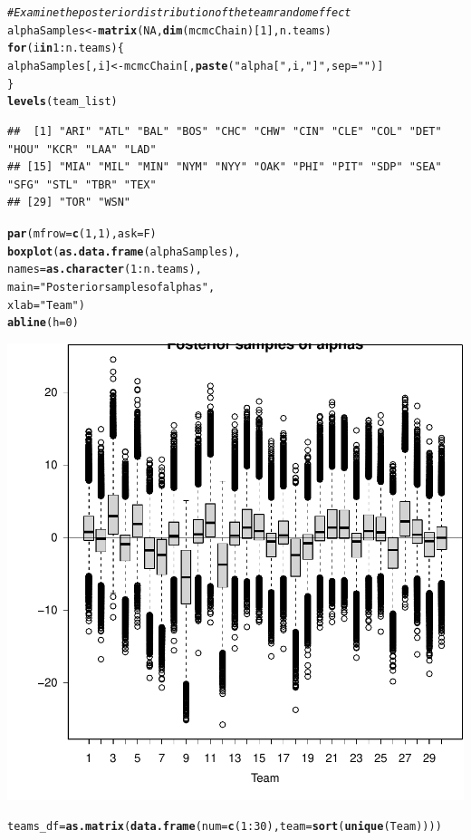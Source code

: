 \documentclass{article}\usepackage[]{graphicx}\usepackage[]{color}
\makeatletter
\newcommand{\hlnum}[1]{\textcolor[rgb]{0.686,0.059,0.569}{#1}}%
\newcommand{\hlstr}[1]{\textcolor[rgb]{0.192,0.494,0.8}{#1}}%
\newcommand{\hlcom}[1]{\textcolor[rgb]{0.678,0.584,0.686}{\textit{#1}}}%
\newcommand{\hlopt}[1]{\textcolor[rgb]{0,0,0}{#1}}%
\newcommand{\hlstd}[1]{\textcolor[rgb]{0.345,0.345,0.345}{#1}}%
\newcommand{\hlkwa}[1]{\textcolor[rgb]{0.161,0.373,0.58}{\textbf{#1}}}%
\newcommand{\hlkwb}[1]{\textcolor[rgb]{0.69,0.353,0.396}{#1}}%
\newcommand{\hlkwc}[1]{\textcolor[rgb]{0.333,0.667,0.333}{#1}}%
\newcommand{\hlkwd}[1]{\textcolor[rgb]{0.737,0.353,0.396}{\textbf{#1}}}%
\newenvironment{kframe}{%
 \def\at@end@of@kframe{}%
 \ifinner\ifhmode%
  \def\at@end@of@kframe{\end{minipage}}%
  \begin{minipage}{\columnwidth}%
 \fi\fi%
 \def\FrameCommand##1{\hskip\@totalleftmargin \hskip-\fboxsep
 \colorbox{shadecolor}{##1}\hskip-\fboxsep
     \hskip-\linewidth \hskip-\@totalleftmargin \hskip\columnwidth}%
 \MakeFramed {\advance\hsize-\width
   \@totalleftmargin\z@ \linewidth\hsize
   \@setminipage}}%
 {\par\unskip\endMakeFramed%
 \at@end@of@kframe}
\newenvironment{knitrout}{}{} %
\makeatother
\begin{document}
\begin{knitrout}
\begin{kframe}\begin{alltt}
\hlcom{# Examine the posterior distribution of the team random effect}
\hlstd{alphaSamples} \hlkwb{<-} \hlkwd{matrix}\hlstd{(}\hlnum{NA}\hlstd{,} \hlkwd{dim}\hlstd{(mcmcChain)[}\hlnum{1}\hlstd{], n.teams)}
\hlkwa{for}\hlstd{(i} \hlkwa{in} \hlnum{1}\hlopt{:}\hlstd{n.teams)\{}
  \hlstd{alphaSamples[,i]}  \hlkwb{<-} \hlstd{mcmcChain[,} \hlkwd{paste}\hlstd{(}\hlstr{"alpha["}\hlstd{,i,}\hlstr{"]"}\hlstd{,} \hlkwc{sep}\hlstd{=}\hlstr{""}\hlstd{)]}
\hlstd{\}}
\hlkwd{levels}\hlstd{(team_list)}
\end{alltt}
\begin{verbatim}
##  [1] "ARI" "ATL" "BAL" "BOS" "CHC" "CHW" "CIN" "CLE" "COL" "DET" "HOU" "KCR" "LAA" "LAD"
## [15] "MIA" "MIL" "MIN" "NYM" "NYY" "OAK" "PHI" "PIT" "SDP" "SEA" "SFG" "STL" "TBR" "TEX"
## [29] "TOR" "WSN"
\end{verbatim}
\begin{alltt}
\hlkwd{par}\hlstd{(}\hlkwc{mfrow}\hlstd{=}\hlkwd{c}\hlstd{(}\hlnum{1}\hlstd{,}\hlnum{1}\hlstd{),} \hlkwc{ask}\hlstd{=F)}
\hlkwd{boxplot}\hlstd{(}\hlkwd{as.data.frame}\hlstd{(alphaSamples),}
        \hlkwc{names}\hlstd{=}\hlkwd{as.character}\hlstd{(}\hlnum{1}\hlopt{:}\hlstd{n.teams),}
        \hlkwc{main}\hlstd{=}\hlstr{"Posterior samples of alphas"}\hlstd{,}
        \hlkwc{xlab}\hlstd{=}\hlstr{"Team"}\hlstd{)}
\hlkwd{abline}\hlstd{(}\hlkwc{h}\hlstd{=}\hlnum{0}\hlstd{)}
\end{alltt}
\end{kframe}

{\centering \includegraphics[width=.6\linewidth]{figure/FinalRFile-4350-Rnwauto-report-16} 

}


\begin{kframe}\begin{alltt}
\hlstd{teams_df} \hlkwb{=} \hlkwd{as.matrix}\hlstd{(}\hlkwd{data.frame}\hlstd{(}\hlkwc{num} \hlstd{=} \hlkwd{c}\hlstd{(}\hlnum{1}\hlopt{:}\hlnum{30}\hlstd{),}\hlkwc{team} \hlstd{=} \hlkwd{sort}\hlstd{(}\hlkwd{unique}\hlstd{(Team))))}


\end{alltt}
\end{kframe}
\end{knitrout}
\end{document}
